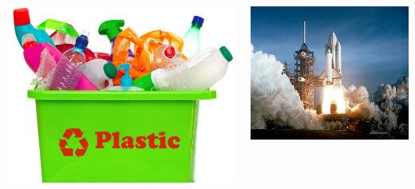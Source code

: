 \documentclass[xcolor=table,serif]{beamer}
\begin{document}
\begin{frame}
\begin{columns}
	\centerline{\includegraphics[scale=0.05]{plastic.jpg}}

	\centerline{\includegraphics[scale=0.5]{space_age.jpg}}	


\end{columns}
\end{frame}
\end{document}
